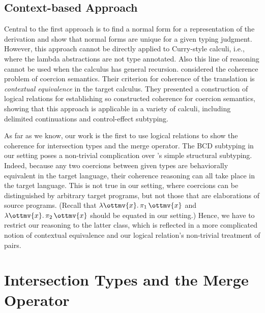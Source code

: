 \subsection{Context-based Approach}

Central to the first approach is to find a normal form for a representation of
the derivation and show that normal forms are unique for a given typing
judgment. However, this approach cannot be directly applied to Curry-style
calculi, i.e., where the lambda abstractions are not type annotated. Also this
line of reasoning cannot be used when the calculus has general recursion.
\citet{biernacki2015logical} considered the coherence problem of coercion
semantics. Their criterion for coherence of the translation is
\textit{contextual equivalence} in the target calculus. They presented a
construction of logical relations for establishing so constructed coherence for
coercion semantics, showing that this approach is applicable in a variety of
calculi, including delimited continuations and control-effect subtyping.

As far as we know, our work is the first to use logical relations to show the
coherence for intersection types and the merge operator. The BCD subtyping in
our setting poses a non-trivial complication over
\citeauthor{biernacki2015logical}'s simple structural subtyping. Indeed, because
any two coercions between given types are behaviorally equivalent in the target
language, their coherence reasoning can all take place in the target language.
This is not true in our setting, where coercions can be distinguished by
arbitrary target programs, but not those that are elaborations of source
programs. (Recall that $ \lambda \ottmv{x} .\, \pi_1 \, \ottmv{x} $ and $ \lambda \ottmv{x} .\, \pi_2 \, \ottmv{x} $ should be equated in our setting.)
Hence, we have to restrict our reasoning to the latter class, which is reflected
in a more complicated notion of contextual equivalence and our logical
relation's non-trivial treatment of pairs.

\section{Intersection Types and the Merge Operator}

